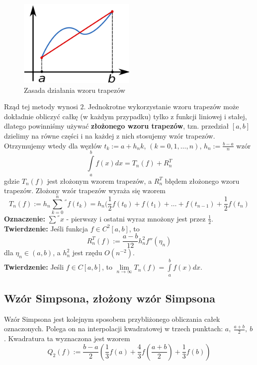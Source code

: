 \documentclass[a4paper,11pt]{article}
\begin{document}
\begin{figure}[H]
\centering
\includegraphics[width=0.5\textwidth]{wzortrapezow.png}
\caption{Zasada działania wzoru trapezów}
\label{wzortrapezow}
\end{figure}

\noindent Rząd tej metody wynosi $2$. Jednokrotne wykorzystanie wzoru trapezów może dokładnie obliczyć całkę (w każdym przypadku) tylko z funkcji liniowej i stałej, dlatego powinniśmy używać \textbf{złożonego wzoru trapezów}, tzn. przedział $[a,b]$ dzielimy na równe części i na każdej z nich stosujemy wzór trapezów. Otrzymujemy wtedy dla węzłów $t_k := a+h_nk$, $(k=0,1,\ldots, n)$, $h_n:=\frac{b-a}{n}$ wzór
$$ \int\limits_{a}^{b} f(x)dx = T_n(f) + R_n^T $$
\noindent gdzie $T_n(f)$ jest złożonym wzorem trapezów, a $ R_n^T$ błędem złożonego wzoru trapezów. Złożony wzór trapezów wyraża się wzorem
$$ T_n(f) := h_n \sum\limits_{k=0}^{n}{}^{''} f(t_k) = h_n(\frac{1}{2}f(t_0) + f(t_1) + \ldots + f(t_{n-1}) + \frac{1}{2}f(t_n)$$
\noindent \textbf{Oznaczenie:} $\sum{}^{''}x$ - pierwszy i ostatni wyraz mnożony jest przez $\frac{1}{2}$. \\
\textbf{Twierdzenie:} Jeśli funkcja $f\in C^2[a,b]$, to 
$$R_n^T(f):= \frac{a-b}{12}h_n^2 f''(\eta_n)$$
\noindent dla $\eta_n \in (a,b)$, a $h_n^2$ jest rzędu $O(n^{-2})$.\\
\noindent \textbf{Twierdzenie:} Jeśli $f\in C[a,b]$, to $\lim\limits_{n\to\infty} T_n(f)=\int\limits_{a}^{b} f(x)dx$.

\subsection{Wzór Simpsona, złożony wzór Simpsona}
Wzór Simpsona jest kolejnym sposobem przybliżonego obliczania całek oznaczonych. Polega on na interpolacji kwadratowej w trzech punktach: $a, \ \frac{a+b}{2}, \ b$. Kwadratura ta wyznaczona jest wzorem
$$ Q_2(f) := \frac{b-a}{2} \left( \frac{1}{3} f(a) + \frac{4}{3} f \left( \frac{a+b}{2} \right) +  \frac{1}{3} f(b) \right) $$
\end{document}
